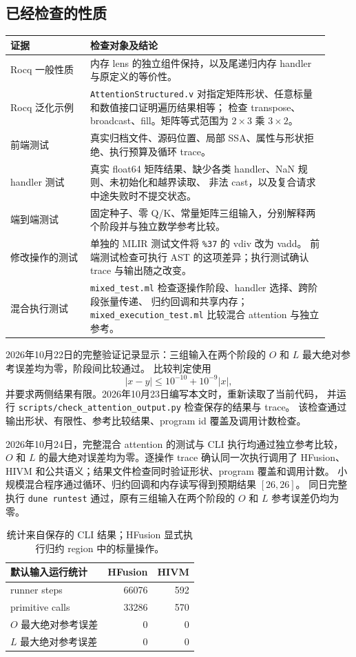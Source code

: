 \documentclass[UTF8,a4paper,11pt,fontset=fandol]{ctexart}
\newcommand{\code}{\nolinkurl}
\begin{document}
{{{{{{{{\subsection{已经检查的性质}

\begin{longtable}{@{}p{0.23\linewidth}p{0.69\linewidth}@{}}
\toprule
证据 & 检查对象及结论\\
\midrule
\endhead
Rocq 一般性质 &
内存 lens 的独立组件保持，以及尾递归内存 handler 与原定义的等价性。\\
Rocq 泛化示例 &
\code{AttentionStructured.v} 对指定矩阵形状、任意标量和数值接口证明遍历结果相等；
检查 transpose、broadcast、fill。矩阵等式范围为 $2\times3$ 乘 $3\times2$。\\
前端测试 &
真实归档文件、源码位置、局部 SSA、属性与形状拒绝、执行预算及循环 trace。\\
handler 测试 &
真实 float64 矩阵结果、缺少各类 handler、NaN 规则、未初始化和越界读取、
非法 cast，以及复合请求中途失败时不提交状态。\\
端到端测试 &
固定种子、零 Q/K、常量矩阵三组输入，分别解释两个阶段并与独立数学参考比较。\\
修改操作的测试 &
单独的 MLIR 测试文件将 \code{%
前端测试检查可执行 AST 的这项差异；执行测试确认 trace 与输出随之改变。\\
混合执行测试 &
\code{mixed_test.ml} 检查逐操作阶段、handler 选择、跨阶段张量传递、
归约回调和共享内存；\code{mixed_execution_test.ml} 比较混合 attention 与独立参考。\\
\bottomrule
\end{longtable}

2026年10月22日的完整验证记录显示：三组输入在两个阶段的 $O$ 和 $L$
最大绝对参考误差均为零，阶段间比较通过。
比较判定使用
\[
  |x-y|\le 10^{-10}+10^{-9}|x|,
\]
并要求两侧结果有限。2026年10月23日编写本文时，重新读取了当前代码，
并运行 \code{scripts/check_attention_output.py} 检查保存的结果与 trace。
该检查通过输出形状、有限性、参考比较结果、program id 覆盖及调用计数检查。

2026年10月24日，完整混合 attention 的测试与 CLI 执行均通过独立参考比较，
$O$ 和 $L$ 的最大绝对误差均为零。逐操作 trace 确认同一次执行调用了
HFusion、HIVM 和公共语义；结果文件检查同时验证形状、program 覆盖和调用计数。
小规模混合程序通过循环、归约回调和内存读写得到预期结果 $[26,26]$。
同日完整执行 \code{dune runtest} 通过，原有三组输入在两个阶段的
$O$ 和 $L$ 参考误差仍均为零。

\begin{table}[htbp]
\centering\small
\begin{tabular}{@{}lrr@{}}
\toprule
默认输入运行统计 & HFusion & HIVM\\
\midrule
runner steps & 66076 & 592\\
primitive calls & 33286 & 570\\
$O$ 最大绝对参考误差 & 0 & 0\\
$L$ 最大绝对参考误差 & 0 & 0\\
\bottomrule
\end{tabular}
\caption{统计来自保存的 CLI 结果；HFusion 显式执行归约 region 中的标量操作。}
\end{table}

}}}}}}}}
\end{document}
